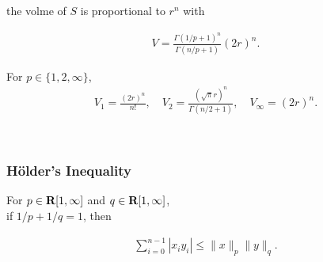 \documentclass{article}
\begin{document}
        the volme of $S$ is proportional to $r^n$ with

        \begin{align*}
            V=\frac{\Gamma(1/p+1)^n }{\Gamma(n/p+1)}(2r)^n.
        \end{align*}

        For $p\in\{1,2,\infty\}$,
        \begin{align*}
            V_1 = \frac{(2r)^n}{n!},
            \quad
            V_2 = \frac{(\sqrt{\pi}r)^n}{\Gamma(n/2+1)},
            \quad 
            V_\infty = (2r)^n.
        \end{align*}

        \\

        
        \subsubsection{Hölder's Inequality}\label{sec:holder}

        For $p\in\textbf{R}[1,\infty]$ and $q\in\textbf{R}[1,\infty]$,\\
        if $1/p+1/q=1$, then 

        \begin{align*}
            \textstyle\sum_{i=0}^{n-1} |x_iy_i| \leq \|x\|_p\|y\|_q.
        \end{align*}



\clearpage
\end{document}
